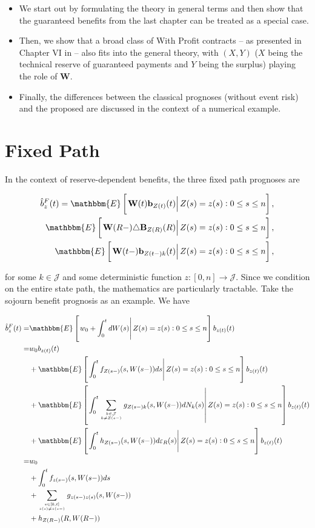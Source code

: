 \documentclass{book}
\newcommand{\1}[1]{\mathbbm{1}_{\left\lbrace #1 \right\rbrace}}
\newcommand{\econd}[2][def]{\mathbbm{E} \left[ \left. #1 \right| #2 \right]}
\theoremstyle{break}
\theoremstyle{remark}
\numberwithin{equation}{section}
\begin{document}
\begin{itemize}
	\item We start out by formulating the theory in general terms and then show that the guaranteed benefits from the last chapter can be treated as a special case. 
	\item Then, we show that a broad class of With Profit contracts -- as presented in Chapter VI in \cite{Liv2Bog} -- also fits into the general theory, with $(X,Y)$ ($X$ being the technical reserve of guaranteed payments and $Y$ being the surplus) playing the role of $\textbf{W}$.
	\item Finally, the differences between the classical prognoses (without event risk) and the proposed are discussed in the context of a numerical example.
\end{itemize}



\section{Fixed Path}

In the context of reserve-dependent benefits, the three fixed path prognoses are

\begin{align*}
	\hat{b}_z^{F}(t) = \econd[\textbf{W}(t)\textbf{b}_{Z(t)}(t)]{Z(s) = z(s) : 0 \leq s \leq n}, \\
	\econd[\textbf{W}(R-)\triangle \textbf{B}_{Z(R)}(R)]{Z(s) = z(s) : 0 \leq s \leq n}, \\
	\econd[\textbf{W}(t-)\textbf{b}_{Z(t-)k}(t)]{ Z(s) = z(s) : 0 \leq s \leq n},
\end{align*}

for some $k \in \mathcal{J}$ and some deterministic function $z: [0,n] \to \mathcal{J}$. Since we condition on the entire state path, the mathematics are particularly tractable. Take the sojourn benefit prognosis as an example. We have

\begin{align*}
	\hat{b}_z^{F}(t) =& \econd[w_0 + \int_0^t dW(s)]{Z(s) = z(s) : 0 \leq s \leq n} b_{z(t)}(t)\\
	=& w_0 b_{z(t)}(t)\\
	&+ \econd[\int_0^t f_{Z(s-)}(s,W(s-)) ds]{Z(s) = z(s) : 0 \leq s \leq n} b_{z(t)}(t)\\
	&+ \econd[\int_0^t \sum_{k \in \mathcal{J} \atop k \neq Z(s-)} g_{Z(s-)k}(s,W(s-)) dN_k(s)]{Z(s) = z(s) : 0 \leq s \leq n} b_{z(t)}(t)\\
	&+ \econd[\int_0^t h_{Z(s-)}(s,W(s-)) d \varepsilon_{R}(s)]{Z(s) = z(s) : 0 \leq s \leq n} b_{z(t)}(t) \\
	=& w_0 \\
	&+ \int_0^t f_{z(s-)}(s,W(s-)) ds  \\
	&+ \sum_{s \in [0,t] \atop z(s) \neq z(s-)} g_{z(s-)z(s)}(s,W(s-)) \\
	&+ h_{Z(R-)}(R,W(R-)) \\
\end{align*}
\end{document}
